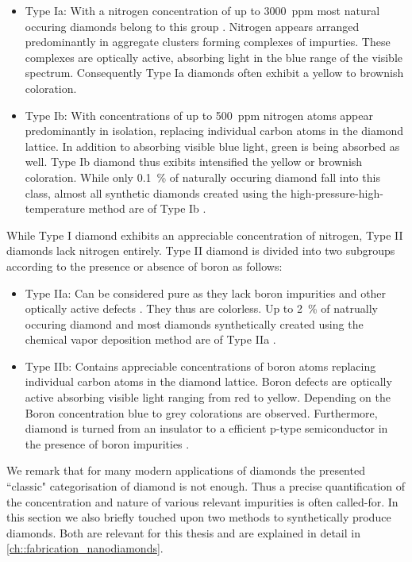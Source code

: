       \begin{itemize}
            \item Type Ia: With a nitrogen concentration of up to \SI{3000}{ppm} most natural occuring diamonds belong to this group \cite{steinmetz::58}. Nitrogen appears arranged predominantly in aggregate clusters forming complexes of impurties. These complexes are optically active, absorbing light in the blue range of the visible spectrum. Consequently Type Ia diamonds often exhibit a yellow to brownish coloration.

            \item Type Ib: With concentrations of up to \SI{500}{ppm} nitrogen atoms appear predominantly in isolation, replacing individual carbon atoms in the diamond lattice. In addition to absorbing visible blue light, green is being absorbed as well. Type Ib diamond thus exibits intensified the yellow or brownish coloration. While only \SI{0.1}{\percent} of naturally occuring diamond fall into this class, almost all synthetic diamonds created using the high-pressure-high-temperature method are of Type Ib \cite{steinmetz::58}.
      \end{itemize}

      While Type I diamond exhibits an appreciable concentration of nitrogen, Type II diamonds lack nitrogen entirely. Type II diamond is divided into two subgroups according to the presence or absence of boron as follows:

      \begin{itemize}
        \item Type IIa: Can be considered pure as they lack boron impurities and other optically active defects \cite{neu::84}. They thus are colorless. Up to \SI{2}{\percent} of natrually occuring diamond and most diamonds synthetically created using the chemical vapor deposition method are of Type IIa \cite{steinmetz::58}.
        \item Type IIb: Contains appreciable concentrations of boron atoms replacing individual carbon atoms in the diamond lattice. Boron defects are optically active absorbing visible light ranging from red to yellow. Depending on the Boron concentration blue to grey colorations are observed. Furthermore, diamond is turned from an insulator to a efficient p-type semiconductor in the presence of boron impurities \cite{steinmetz::59}.
      \end{itemize}

      We remark that for many modern applications of diamonds the presented ``classic" categorisation of diamond is not enough. Thus a precise quantification of the concentration and nature of various relevant impurities is often called-for. In this section we also briefly touched upon two methods to synthetically produce diamonds. Both are relevant for this thesis and are explained in detail in \autoref{ch::fabrication_nanodiamonds}.

